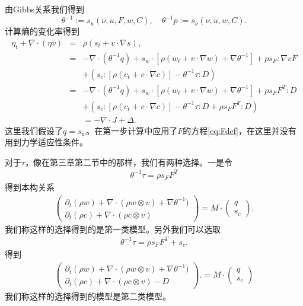 由Gibbs关系我们得到
$$\theta^{-1}:=s_{u} (\nu,u,F, w,C), \quad \theta^{-1} p := s_\nu (\nu,u,w,C).$$
计算熵的变化率得到
\begin{eqnarray*}
		\eta_t + \nabla \cdot (\eta v) &=& \rho (s_t + v \cdot \nabla s), \\
		&=& -\nabla \cdot (\theta^{-1} q) + s_w \cdot [\rho (w_t + v \cdot \nabla w) + \nabla \theta^{-1}] + \rho s_F : \nabla v F  \\
		&& + (s_c:[\rho (c_t + v \cdot \nabla c)] - \theta^{-1} \tau : D) \\
		&=& -\nabla \cdot (\theta^{-1} q) + s_w \cdot [\rho (w_t + v \cdot \nabla w)+\nabla \theta^{-1}] + \rho s_F F^T : D  \\
		&& + (s_c:[\rho (c_t + v \cdot \nabla c)] - \theta^{-1} \tau : D + \rho s_F F^T : D)  \\
		&& = -\nabla \cdot J + \Delta.
\end{eqnarray*}
这里我们假设了$q=s_w$。在第一步计算中应用了$F$的方程\eqref{eq:Fdef}，在这里并没有用到力学适应性条件。

对于$\tau$，像在第三章第二节中的那样，我们有两种选择。一是令
\begin{eqnarray*}
\theta^{-1} \tau = \rho s_F F^T 
\end{eqnarray*}
得到本构关系
\begin{eqnarray}\label{eq:finite1}
\left( \begin{array}{c} \partial_t (\rho w) + \nabla \cdot (\rho w \otimes v) + \nabla \theta^{-1}) \\
	\partial_t (\rho c) + \nabla \cdot (\rho c \otimes v) \end{array} \right)
=
M \cdot \left( \begin{array}{c} q \\ s_c \end{array} \right).
\end{eqnarray}
我们称这样的选择得到的是第一类模型。另外我们可以选取
\begin{eqnarray*}
	\theta^{-1} \tau = \rho s_F F^T + s_c.
\end{eqnarray*}
得到
\begin{eqnarray}\label{eq:finite2}
\left( \begin{array}{c} \partial_t (\rho w) + \nabla \cdot (\rho w \otimes v) + \nabla \theta^{-1}) \\
	\partial_t (\rho c) + \nabla \cdot (\rho c \otimes v) - D \end{array} \right).
=
M \cdot \left( \begin{array}{c} q \\ s_c  \end{array} \right)
\end{eqnarray}
我们称这样的选择得到的模型是第二类模型。

